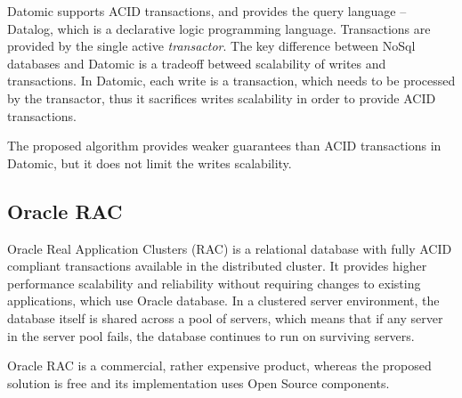 Datomic supports ACID transactions, and provides the query language -- Datalog, which is a declarative logic programming language. Transactions are provided by the single active \emph{transactor}. The key difference between NoSql databases and Datomic is a tradeoff betweed scalability of writes and transactions. In Datomic, each write is a transaction, which needs to be processed by the transactor, thus it sacrifices writes scalability in order to provide ACID transactions.

The proposed algorithm provides weaker guarantees than ACID transactions in Datomic, but it does not limit the writes scalability. 


\subsection{Oracle RAC}
Oracle Real Application Clusters (RAC) is a relational database with fully ACID compliant transactions available in the distributed cluster. It provides higher performance scalability and
reliability without requiring changes to existing applications, which use Oracle database.
In a clustered server environment, the database
itself is shared across a pool of servers, which means that if any server in the server pool fails,
the database continues to run on surviving servers.

 Oracle RAC is a commercial, rather expensive product, whereas the proposed solution is free and its implementation uses Open Source components.

